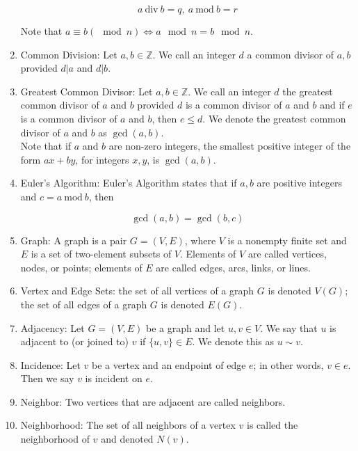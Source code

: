\documentclass{article}
\begin{document}
\begin{enumerate}
    \[a \:\text{div}\:b=q,\: a \:\text{mod}\: b=r\]

    Note that $a\equiv b (\mod n) \Longleftrightarrow a\mod n=b\mod n$.

    \item Common Division: Let $a,b\in\mathbb{Z}$.
    We call an integer $d$ a common divisor of $a,b$ provided $d|a$ and $d|b$.

    \item Greatest Common Divisor: Let $a,b\in\mathbb{Z}$.
    We call an integer $d$ the greatest common divisor of $a$ and $b$ provided $d$ is a common divisor of $a$ and $b$ and if $e$ is a common divisor of $a$ and $b$, then $e\leq d$.
    We denote the greatest common divisor of $a$ and $b$ as $\gcd(a,b)$.\\

    Note that if $a$ and $b$ are non-zero integers, the smallest positive integer of the form $ax+by$, for integers $x,y$, is $\gcd(a,b)$.

    \item Euler's Algorithm: Euler's Algorithm states that if $a,b$ are positive integers and $c=a\: \text{mod} \: b$, then

    \[\gcd(a,b)=\gcd(b, c)\]

    \item Graph: A graph is a pair $G=(V,E)$, where $V$ is a nonempty finite set and $E$ is a set of two-element subsets of $V$.
    Elements of $V$ are called vertices, nodes, or points;
    elements of $E$ are called edges, arcs, links, or lines.

    \item Vertex and Edge Sets: the set of all vertices of a graph $G$ is denoted $V(G)$; the set of all edges of a graph $G$ is denoted $E(G)$.

    \item Adjacency: Let $G=(V,E)$ be a graph and let $u,v\in V$.
    We say that $u$ is adjacent to (or joined to) $v$ if $\{u,v\}\in E$.
    We denote this as $u\sim v$.

    \item Incidence: Let $v$ be a vertex and an endpoint of edge $e$; in other words, $v\in e$.
    Then we say $v$ is incident on $e$.

    \item Neighbor: Two vertices that are adjacent are called neighbors.

    \item Neighborhood: The set of all neighbors of a vertex $v$ is called the neighborhood of $v$ and denoted $N(v)$.


\end{enumerate}
\end{document}
